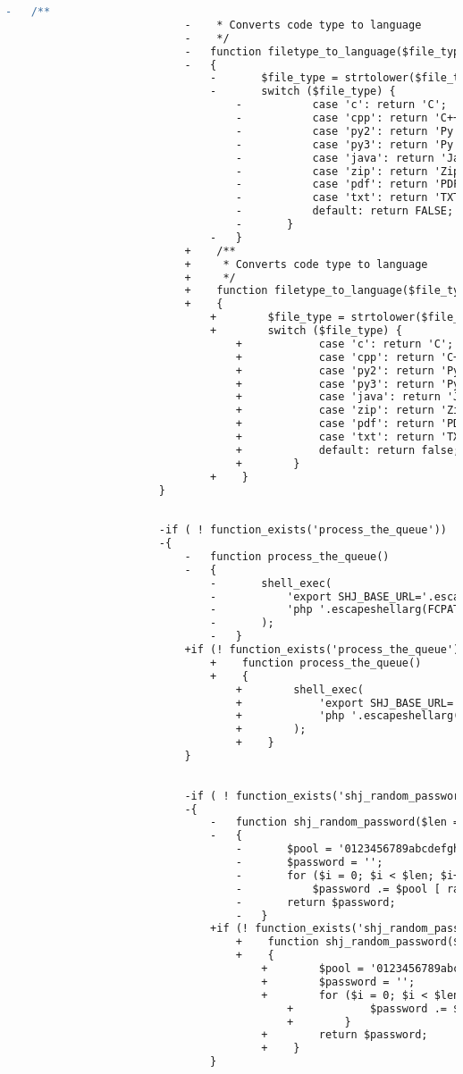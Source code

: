 \begin{lstlisting}[language=diff, caption=Perubahan pada kode shj\_helper.php]
							-	/**
							-	 * Converts code type to language
							-	 */
							-	function filetype_to_language($file_type)
							-	{
								-		$file_type = strtolower($file_type);
								-		switch ($file_type) {
									-			case 'c': return 'C';
									-			case 'cpp': return 'C++';
									-			case 'py2': return 'Py 2';
									-			case 'py3': return 'Py 3';
									-			case 'java': return 'Java';
									-			case 'zip': return 'Zip';
									-			case 'pdf': return 'PDF';
									-			case 'txt': return 'TXT';
									-			default: return FALSE;
									-		}
								-	}
							+    /**
							+     * Converts code type to language
							+     */
							+    function filetype_to_language($file_type)
							+    {
								+        $file_type = strtolower($file_type);
								+        switch ($file_type) {
									+            case 'c': return 'C';
									+            case 'cpp': return 'C++';
									+            case 'py2': return 'Py 2';
									+            case 'py3': return 'Py 3';
									+            case 'java': return 'Java';
									+            case 'zip': return 'Zip';
									+            case 'pdf': return 'PDF';
									+            case 'txt': return 'TXT';
									+            default: return false;
									+        }
								+    }
						}
						
						
						-if ( ! function_exists('process_the_queue'))
						-{
							-	function process_the_queue()
							-	{
								-		shell_exec(
								-			'export SHJ_BASE_URL='.escapeshellarg(base_url()).'; '.
								-			'php '.escapeshellarg(FCPATH.'index.php')." queueprocess run >/dev/null 2>/dev/null &"
								-		);
								-	}
							+if (! function_exists('process_the_queue')) {
								+    function process_the_queue()
								+    {
									+        shell_exec(
									+            'export SHJ_BASE_URL='.escapeshellarg(base_url()).'; '.
									+            'php '.escapeshellarg(FCPATH.'index.php')." queueprocess run >/dev/null 2>/dev/null &"
									+        );
									+    }
							}
							
							
							-if ( ! function_exists('shj_random_password'))
							-{
								-	function shj_random_password($len = 6)
								-	{
									-		$pool = '0123456789abcdefghijklmnopqrstuvwxyzABCDEFGHIJKLMNOPQRSTUVWXYZ|!@#$%^&*()_-+=\\/[]{}\'":;?<>.,~';
									-		$password = '';
									-		for ($i = 0; $i < $len; $i++)
									-			$password .= $pool [ rand(0, strlen($pool)-1) ];
									-		return $password;
									-	}
								+if (! function_exists('shj_random_password')) {
									+    function shj_random_password($len = 6)
									+    {
										+        $pool = '0123456789abcdefghijklmnopqrstuvwxyzABCDEFGHIJKLMNOPQRSTUVWXYZ|!@#$%^&*()_-+=\\/[]{}\'":;?<>.,~';
										+        $password = '';
										+        for ($i = 0; $i < $len; $i++) {
											+            $password .= $pool [ rand(0, strlen($pool) - 1) ];
											+        }
										+        return $password;
										+    }
								}
								

\end{lstlisting}
